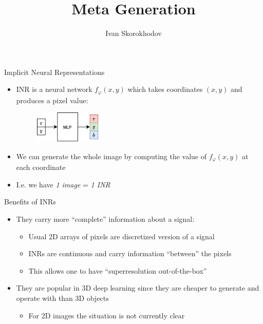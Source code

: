 \documentclass[10pt, handout]{beamer}
\title{Meta Generation}
\author{Ivan Skorokhodov}
\begin{document}
\begin{frame}
    \titlepage
\end{frame}


\begin{frame}{Implicit Neural Representations}
\begin{itemize}
    \item\pause INR is a neural network $f_\varphi(x,y)$ which takes coordinates $(x,y)$ and produces a pixel value:
    \begin{figure}
        \centering
        \includegraphics[width=0.3\textwidth]{images/inr}
    \end{figure}
    \item\pause We can generate the whole image by computing the value of $f_\varphi(x,y)$ at each coordinate
    \item\pause I.e. we have \textit{1 image} = \textit{1 INR}
\end{itemize}
\end{frame}


\begin{frame}{Benefits of INRs}
    \begin{itemize}
        \item\pause They carry more ``complete'' information about a signal:
        \begin{itemize}
            \item Usual 2D arrays of pixels are discretized version of a signal
            \item INRs are continuous and carry information ``between'' the pixels
            \item This allows one to have ``superresolution out-of-the-box''
        \end{itemize}
        \item\pause They are popular in 3D deep learning since they are cheaper to generate and operate with than 3D objects
        \begin{itemize}
            \item\pause For 2D images the situation is not currently clear
        \end{itemize}
    \end{itemize}
\end{frame}
\end{document}
